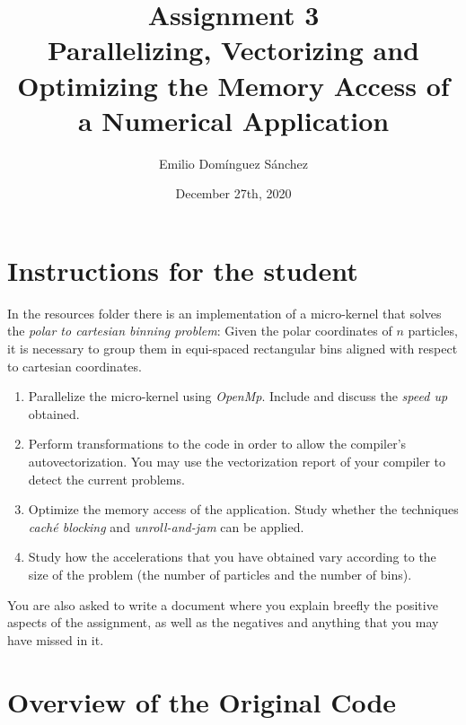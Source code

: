 \documentclass[
    12pt, %
]{fphw}
\title{Assignment 3 \\
    Parallelizing, Vectorizing and Optimizing the Memory Access
    of a Numerical Application} %
\author{Emilio Domínguez Sánchez} %
\date{December 27th, 2020} %
\institute{University of Murcia \\ Faculty of Informatics} %
\newcommand{\OpenMp}{\textit{OpenMp}}
\begin{document}
\maketitle %


\section*{Instructions for the student}

    In the resources folder there is an implementation of a micro-kernel that
solves the \textit{polar to cartesian binning problem}:
Given the polar coordinates of $n$ particles,
it is necessary to group them in equi-spaced rectangular bins
aligned with respect to cartesian coordinates.

\begin{enumerate}
    \item Parallelize the micro-kernel using \OpenMp{}.
    Include and discuss the \textit{speed up} obtained.

    \item Perform transformations to the code in order to
    allow the compiler's autovectorization.
    You may use the vectorization report of your compiler to detect the current problems.

    \item Optimize the memory access of the application.
    Study whether the techniques \textit{caché blocking} and \textit{unroll-and-jam}
    can be applied.

    \item Study how the accelerations that you have obtained vary according to
    the size of the problem (the number of particles and the number of bins).
\end{enumerate}
    
    You are also asked to write a document where you
explain breefly the positive aspects of the assignment,
as well as the negatives and
anything that you may have missed in it.

\newpage


\section{Overview of the Original Code}
\end{document}
